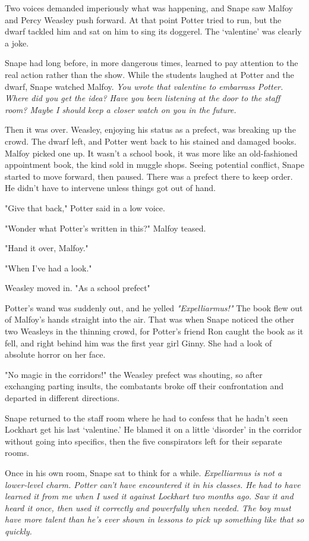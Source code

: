 Two voices demanded imperiously what was happening, and Snape saw Malfoy and Percy Weasley push forward. At that point Potter tried to run, but the dwarf tackled him and sat on him to sing its doggerel. The `valentine' was clearly a joke.

Snape had long before, in more dangerous times, learned to pay attention to the real action rather than the show. While the students laughed at Potter and the dwarf, Snape watched Malfoy. \emph{You wrote that valentine to embarrass Potter. Where did you get the idea? Have you been listening at the door to the staff room? Maybe I should keep a closer watch on you in the future.}

Then it was over. Weasley, enjoying his status as a prefect, was breaking up the crowd. The dwarf left, and Potter went back to his stained and damaged books. Malfoy picked one up. It wasn't a school book, it was more like an old-fashioned appointment book, the kind sold in muggle shops. Seeing potential conflict, Snape started to move forward, then paused. There was a prefect there to keep order. He didn't have to intervene unless things got out of hand.

"Give that back," Potter said in a low voice.

"Wonder what Potter's written in this?" Malfoy teased.

"Hand it over, Malfoy."

"When I've had a look."

Weasley moved in. "As a school prefect{\el}"

Potter's wand was suddenly out, and he yelled \emph{"Expelliarmus!"} The book flew out of Malfoy's hands straight into the air. That was when Snape noticed the other two Weasleys in the thinning crowd, for Potter's friend Ron caught the book as it fell, and right behind him was the first year girl Ginny. She had a look of absolute horror on her face.

"No magic in the corridors!" the Weasley prefect was shouting, so after exchanging parting insults, the combatants broke off their confrontation and departed in different directions.

Snape returned to the staff room where he had to confess that he hadn't seen Lockhart get his last `valentine.' He blamed it on a little `disorder' in the corridor without going into specifics, then the five conspirators left for their separate rooms.

Once in his own room, Snape sat to think for a while. \emph{Expelliarmus is not a lower-level charm. Potter can't have encountered it in his classes. He had to have learned it from me when I used it against Lockhart two months ago. Saw it and heard it once, then used it correctly and powerfully when needed. The boy must have more talent than he's ever shown in lessons to pick up something like that so quickly.}

